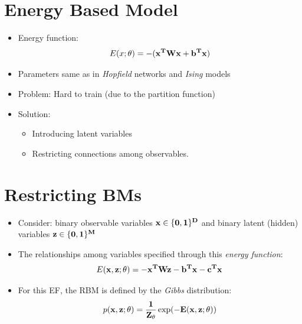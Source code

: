 \documentclass{antclass}
\begin{document}
\section{Energy Based Model}

\begin{itemize}
	 	
	\item Energy function:
	\[
	E(x;\theta) = - (\bf{x}^T\bf{Wx}+\bf{b}^T\bf{x})
	\]
	\item Parameters same as in \textit{Hopfield} networks and \textit{Ising} models
	
	\item Problem: Hard to train (due to the partition function)
	\item Solution:
	\begin{itemize}
		\item Introducing latent variables
		\item  Restricting connections among observables.
	\end{itemize}

\end{itemize}

\section{Restricting BMs}
\begin{itemize}
	\item Consider: binary observable variables \(\bf{x}\in \{0,1\}^D \) and binary latent (hidden) variables \(\bf{z}\in \{0,1\}^M\)
	\item The relationships among variables
	specified through this \textit{energy function}:
	\begin{equation}
		E(\bf{x,z};\theta) = - \bf{x}^T\bf{Wz}-\bf{b}^T\bf{x} -\bf{c}^Tx
	\end{equation} 
	\item For this EF, the RBM is defined by the \textit{Gibbs} distribution:
	\begin{equation}
	p(\bf{x,z};\theta) = \frac{1}{Z_\theta}\exp(-E(\bf{x,z};\theta))
	\end{equation}
	
	
\end{itemize} 

\pagebreak
\end{document}
